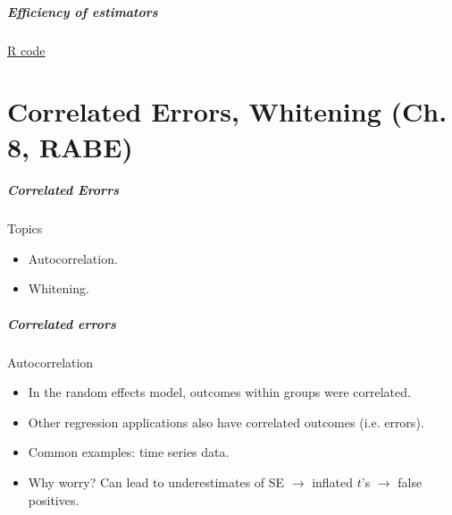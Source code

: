 \documentclass[handout]{beamer}
\begin{document}
   \begin{frame}
   \frametitle{Efficiency of estimators}
   \begin{center}
   \end{center}
   \href{http://stats191.stanford.edu/transformations.html#efficiency}{R code}
   \end{frame}

   \part{Correlated Errors, Whitening  (Ch. 8, RABE)}
   \frame{\partpage}


   \begin{frame} \frametitle{Correlated Erorrs}

   \begin{block}
   {Topics}
   \begin{itemize}

   \item Autocorrelation.


   \item Whitening.
   \end{itemize}
   \end{block}
   \end{frame}


   \begin{frame} \frametitle{Correlated errors}

   \begin{block}
   {Autocorrelation                     }

   \begin{itemize}

   \item In the random effects model, outcomes within groups
   were correlated.

   \item Other regression applications also have correlated outcomes (i.e. errors).

   \item Common examples: time series data.

   \item Why worry? Can lead to underestimates of SE $\rightarrow$ inflated $t$'s $\rightarrow$ false positives.

   \end{itemize}
   \end{block}
   \end{frame}
\end{document}
